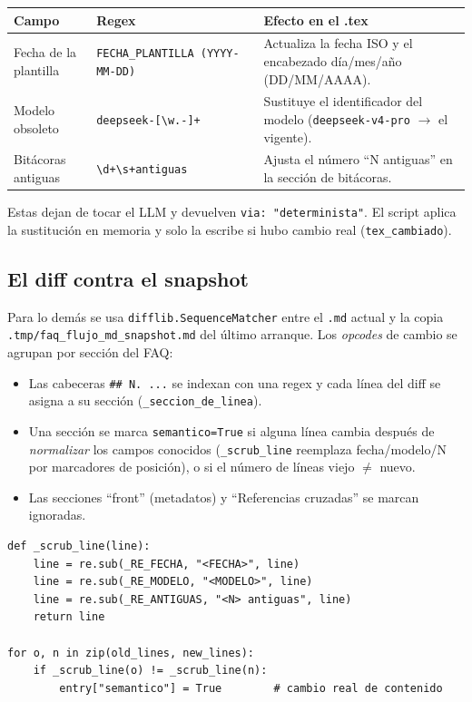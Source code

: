 \documentclass[11pt,a4paper]{article}
\begin{document}
\begin{table}[h!]
\centering
\small
\begin{tabularx}{\linewidth}{@{}p{2.9cm}p{5.4cm}X@{}}
\toprule
Campo & Regex & Efecto en el .tex \\
\midrule
Fecha de la plantilla & \texttt{FECHA\_PLANTILLA\ (YYYY-MM-DD)} & Actualiza la fecha ISO y el encabezado día/mes/año (DD/MM/AAAA). \\
Modelo obsoleto & \texttt{deepseek-[\textbackslash{}w.-]+} & Sustituye el identificador del modelo (\texttt{deepseek-v4-pro} $\rightarrow$ el vigente). \\
Bitácoras antiguas & \texttt{\textbackslash{}d+\textbackslash{}s+antiguas} & Ajusta el número ``N antiguas'' en la sección de bitácoras. \\
\bottomrule
\end{tabularx}
\end{table}

Estas dejan de tocar el LLM y devuelven \texttt{via: "determinista"}. El script aplica la
sustitución en memoria y solo la escribe si hubo cambio real (\texttt{tex\_cambiado}).

\subsection{El diff contra el snapshot}

Para lo demás se usa \texttt{difflib.SequenceMatcher} entre el \texttt{.md} actual y la copia
\texttt{.tmp/faq\_flujo\_md\_snapshot.md} del último arranque. Los \emph{opcodes} de cambio se
agrupan por sección del FAQ:

\begin{itemize}[leftmargin=1.4em]
  \item Las cabeceras \texttt{\#\# N. ...} se indexan con una regex y cada línea del diff se
        asigna a su sección (\texttt{\_seccion\_de\_linea}).
  \item Una sección se marca \texttt{semantico=True} si alguna línea cambia después de
        \emph{normalizar} los campos conocidos (\texttt{\_scrub\_line} reemplaza fecha/modelo/N
        por marcadores de posición), o si el número de líneas viejo $\neq$ nuevo.
  \item Las secciones ``front'' (metadatos) y ``Referencias cruzadas'' se marcan ignoradas.
\end{itemize}

\begin{lstlisting}
def _scrub_line(line):
    line = re.sub(_RE_FECHA, "<FECHA>", line)
    line = re.sub(_RE_MODELO, "<MODELO>", line)
    line = re.sub(_RE_ANTIGUAS, "<N> antiguas", line)
    return line

for o, n in zip(old_lines, new_lines):
    if _scrub_line(o) != _scrub_line(n):
        entry["semantico"] = True        # cambio real de contenido
\end{lstlisting}
\end{document}

